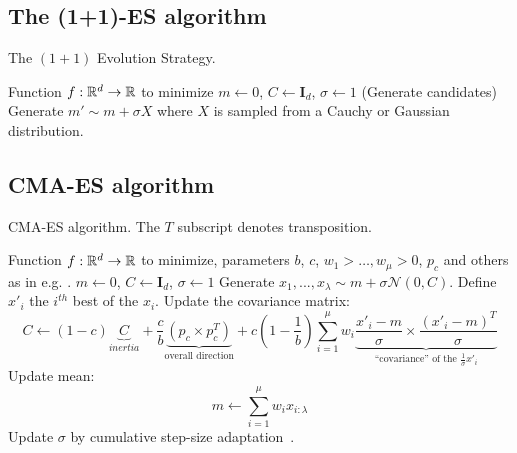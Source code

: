 \subsection{The (1+1)-ES algorithm}
\begin{algorithm}
\caption{\label{opo}The $(1+1)$ Evolution Strategy.}
\begin{algorithmic}
\REQUIRE Function $f:\mathbb{R}^d\to\mathbb{R}$ to minimize%
\STATE $m\leftarrow 0$, $C\leftarrow \boldsymbol{I}_d$, $\sigma\leftarrow 1$
\STATE (Generate candidates)
\STATE Generate $m' \sim m+\sigma X$ where $X$ is sampled from a Cauchy or Gaussian distribution.
\ELSE
{}
\ENDIF
\ENDFOR
\end{algorithmic}
\end{algorithm}

\subsection{CMA-ES algorithm}
\begin{algorithm}
\caption{\label{cmaalg}CMA-ES algorithm. The $T$ subscript denotes transposition.}
\begin{algorithmic}
\REQUIRE Function $f:\mathbb{R}^d\to\mathbb{R}$ to minimize, parameters $b$, $c$, $w_1>\dots,w_\mu>0$, $p_c$ and others as in e.g. \citep{HAN}.%
\STATE $m\leftarrow 0$, $C\leftarrow \boldsymbol{I}_d$, $\sigma\leftarrow 1$
\STATE Generate $x_1,...,x_\lambda \sim m + \sigma \mathcal{N}(0,C)$.
\STATE Define $x'_{i}$ the $i^{th}$ best of the $x_i$.
\STATE Update the covariance matrix:
$$C\leftarrow (1-c)\underbrace{C}_{inertia}+\frac cb \underbrace{(p_c\times p_c^T)}_{\mbox{overall direction}} +c(1-\frac 1b)\sum_{i=1}^\mu w_i\underbrace{\frac{x'_i-m}\sigma\times \frac{(x'_i-m)^T}\sigma}_{\mbox{``covariance'' of the $\frac1\sigma x'_i$}}$$
\STATE Update mean:%
$$m\leftarrow \sum_{i=1}^\mu w_i x_{i:\lambda}$$
\STATE Update $\sigma$ by cumulative step-size adaptation~\citep{csalinear}.
\ENDFOR
\end{algorithmic}
\end{algorithm}

